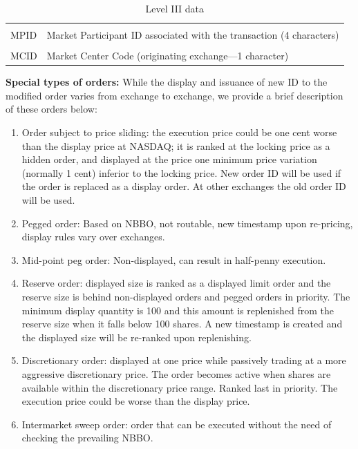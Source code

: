 \begin{table}[!ht]
\begin{tabular}{lp{}}
	& \\
	MPID & Market Participant ID associated with the transaction (4 characters) \\
	& \\
	MCID & Market Center Code (originating exchange---1 character) 
	\end{tabular}
	\caption{Level III data \label{tab:level3data}}
	\end{table}
	

\noindent\textbf{Special types of orders:} While the display and issuance of new ID to the modified order varies from exchange to exchange, we provide a brief description of these orders below:
\begin{enumerate}[1.]
\item Order subject to price sliding: the execution price could be one cent worse than the display price at NASDAQ; it is ranked at the locking price as a hidden order, and displayed at the price one minimum price variation (normally 1 cent) inferior to the locking price. New order ID will be used if the order is replaced as a display order. At other exchanges the old order ID will be used.

\item Pegged order: Based on NBBO, not routable, new timestamp upon re-pricing, display rules vary over exchanges.

\item Mid-point peg order: Non-displayed, can result in half-penny execution.

\item Reserve order: displayed size is ranked as a displayed limit order and the reserve size is behind non-displayed orders and pegged orders in priority. The minimum display quantity is 100 and this amount is replenished from the reserve size when it falls below 100 shares. A new timestamp is created and the displayed size will be re-ranked upon replenishing.

\item Discretionary order: displayed at one price while passively trading at a more aggressive discretionary price. The order becomes active when shares are available within the discretionary price range. Ranked last in priority. The execution price could be worse than the display price.

\item Intermarket sweep order: order that can be executed without the need of checking the prevailing NBBO.  
\end{enumerate}


